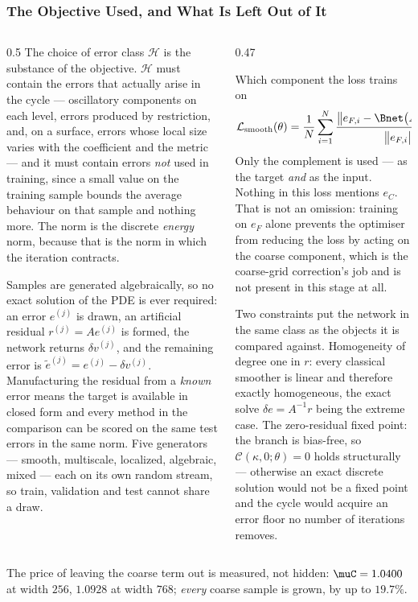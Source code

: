 \frametitle{The Objective Used, and What Is Left Out of It}
\footnotesize

\begin{columns}[T]
\begin{column}{0.5\textwidth}
The choice of error class $\mathcal{H}$ is the substance of the objective. $\mathcal{H}$
must contain the errors that actually arise in the cycle --- oscillatory components on each
level, errors produced by restriction, and, on a surface, errors whose local size varies
with the coefficient and the metric --- and it must contain errors \emph{not} used in
training, since a small value on the training sample bounds the average behaviour on that
sample and nothing more. The norm is the discrete \emph{energy} norm, because that is the
norm in which the iteration contracts.

Samples are generated \alert{algebraically}, so no exact solution of the PDE is ever
required: an error $e^{(j)}$ is drawn, an artificial residual $r^{(j)}=Ae^{(j)}$ is formed,
the network returns $\delta v^{(j)}$, and the remaining error is
$\widetilde e^{(j)}=e^{(j)}-\delta v^{(j)}$. Manufacturing the residual from a
\emph{known} error means the target is available in closed form and every method in the
comparison can be scored on the same test errors in the same norm. Five generators ---
smooth, multiscale, localized, algebraic, mixed --- each on its own random stream, so
train, validation and test cannot share a draw.
\end{column}
\begin{column}{0.47\textwidth}
\begin{block}{Which component the loss trains on}
\[
\mathcal{L}_{\mathrm{smooth}}(\theta)=\frac1N\sum_{i=1}^{N}
\frac{\bigl\|e_{F,i}-\Bnet\bigl(Ae_{F,i},X\bigr)\bigr\|_A^2}
     {\bigl\|e_{F,i}\bigr\|_A^2}
\]
\alert{Only the complement is used --- as the target \emph{and} as the input.} Nothing in
this loss mentions $e_C$. That is not an omission: training on $e_F$ alone prevents the
optimiser from reducing the loss by acting on the coarse component, which is the
coarse-grid correction's job and is not present in this stage at all.
\end{block}

\raggedright
Two constraints put the network in the same class as the objects it is compared against.
\alert{Homogeneity of degree one} in $r$: every classical smoother is linear and therefore
exactly homogeneous, the exact solve $\delta e=A^{-1}r$ being the extreme case. \alert{The
zero-residual fixed point}: the branch is bias-free, so $\mathcal{C}(\kappa,0;\theta)=0$
holds structurally --- otherwise an exact discrete solution would not be a fixed point and
the cycle would acquire an error floor no number of iterations removes.
\end{column}
\end{columns}

\bre
The price of leaving the coarse term out is measured, not hidden: $\muC=1.0400$ at width
$256$, $1.0928$ at width $768$; \emph{every} coarse sample is grown, by up to $19.7\%$.
\ere
